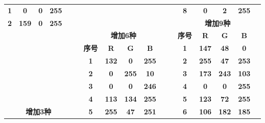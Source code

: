 \begin{table}[H]
\begin{tabular}{|ccccc|r|ccccr|r|ccccc|}
		\textbf{1} & \textbf{0} & \textbf{0} & \textbf{255} & \cellcolor[rgb]{ 0,  0,  1} & \multicolumn{1}{r}{} &       &       &       &       & \multicolumn{1}{r}{} &       & \textbf{8} & \textbf{0} & \textbf{2} & \textbf{255} & \cellcolor[rgb]{ 0,  .008,  1} \\
		\cmidrule{13-17}    \textbf{2} & \textbf{159} & \textbf{0} & \textbf{255} & \cellcolor[rgb]{ .624,  0,  1} & \multicolumn{1}{r}{} &       &       &       &       & \multicolumn{1}{r}{} & \multicolumn{1}{r}{} & \multicolumn{5}{c}{\textbf{增加9种}} \\
		\cmidrule{1-5}\cmidrule{13-17}    \multicolumn{1}{r}{} &       &       &       & \multicolumn{1}{r}{} & \multicolumn{1}{r}{} & \multicolumn{5}{c}{\textbf{增加6种}}     &       & \textbf{序号} & \textbf{R} & \textbf{G} & \textbf{B} &  \\
		\cmidrule{7-11}    \multicolumn{1}{r}{} &       &       &       & \multicolumn{1}{r}{} &       & \textbf{序号} & \textbf{R} & \textbf{G} & \textbf{B} &       &       & \textbf{1} & \textbf{147} & \textbf{48} & \textbf{0} & \cellcolor[rgb]{ .576,  .188,  0} \\
		\multicolumn{1}{r}{} &       &       &       & \multicolumn{1}{r}{} &       & \textbf{1} & \textbf{132} & \textbf{0} & \textbf{255} & \cellcolor[rgb]{ .518,  0,  1} &       & \textbf{2} & \textbf{255} & \textbf{47} & \textbf{253} & \cellcolor[rgb]{ 1,  .184,  .992} \\
		\multicolumn{1}{r}{} &       &       &       & \multicolumn{1}{r}{} &       & \textbf{2} & \textbf{0} & \textbf{255} & \textbf{10} & \cellcolor[rgb]{ 0,  1,  .039} &       & \textbf{3} & \textbf{173} & \textbf{243} & \textbf{103} & \cellcolor[rgb]{ .678,  .953,  .404} \\
		\multicolumn{1}{c}{} &       &       &       & \multicolumn{1}{c}{} &       & \textbf{3} & \textbf{0} & \textbf{0} & \textbf{246} & \cellcolor[rgb]{ 0,  0,  .965} &       & \textbf{4} & \textbf{0} & \textbf{0} & \textbf{255} & \cellcolor[rgb]{ 0,  0,  1} \\
		\multicolumn{1}{c}{} &       &       &       & \multicolumn{1}{c}{} &       & \textbf{4} & \textbf{113} & \textbf{134} & \textbf{255} & \cellcolor[rgb]{ .443,  .525,  1} &       & \textbf{5} & \textbf{123} & \textbf{72} & \textbf{255} & \cellcolor[rgb]{ .482,  .282,  1} \\
		\multicolumn{5}{c}{\textbf{增加3种}}     &       & \textbf{5} & \textbf{255} & \textbf{47} & \textbf{251} & \cellcolor[rgb]{ 1,  .184,  .984} &       & \textbf{6} & \textbf{106} & \textbf{182} & \textbf{185} & \cellcolor[rgb]{ .416,  .714,  .725} \\

\end{tabular}
\end{table}

